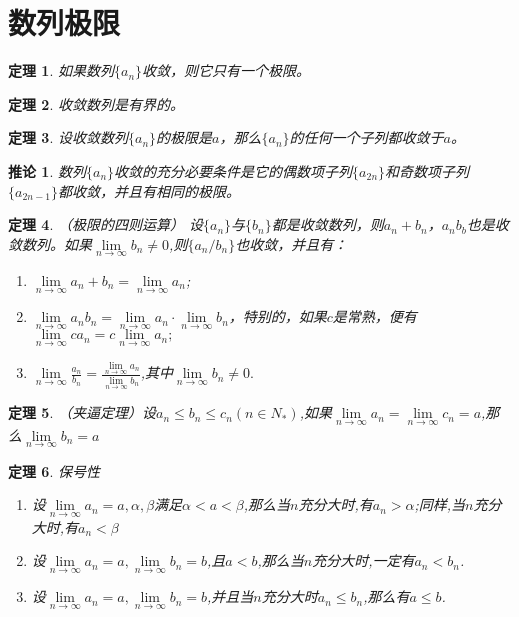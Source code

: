 \documentclass[UTF8]{ctexart}
\newtheorem{theorem}{定理}[section]
\newtheorem{coro}{推论}[theorem]
\begin{document}
	\section{数列极限}
	\begin{theorem}
		如果数列$\{a_n\}$收敛，则它只有一个极限。
	\end{theorem}
	\begin{theorem}
	收敛数列是有界的。
	\end{theorem}
	\begin{theorem}
	设收敛数列$\{a_n\}$的极限是$a$，那么$\{a_n\}$的任何一个子列都收敛于$a$。
	\end{theorem}
	\begin{coro}
		数列$\{a_n\}$收敛的充分必要条件是它的偶数项子列$\{a_{2n}\}$和奇数项子列$\{a_{2n-1}\}$都收敛，并且有相同的极限。
	\end{coro}
	\begin{theorem}（极限的四则运算）
	设$\{a_n\}$与$\{b_n\}$都是收敛数列，则${a_n+b_n}$，${a_nb_b}$也是收敛数列。如果$\lim\limits_{n\to\infty}b_n\neq0$,则$\{a_n/b_n\}$也收敛，并且有：
	\begin{enumerate}
		\item $\lim\limits_{n\to\infty}a_n+b_n=\lim\limits_{n\to\infty}a_n$;
		\item $\lim\limits_{n\to\infty}a_nb_n=\lim\limits_{n\to\infty}a_n \cdot \lim\limits_{n\to\infty}b_n$，特别的，如果$c$是常熟，便有$\lim\limits_{n\to\infty}ca_n=c\lim\limits_{n\to\infty}a_n;$
		\item $\lim\limits_{n\to\infty} \frac{a_n}{b_n}=\frac{\lim\limits_{n\to\infty}a_n}{\lim\limits_{n\to\infty}b_n}$,其中$\lim\limits_{n\to\infty}b_n\neq0.$	
	\end{enumerate}
	\end{theorem}
	\begin{theorem}
	（夹逼定理）设$a_n\leq b_n \leq c_n (n\in N_*)$,如果$\lim\limits_{n\to\infty}a_n=\lim\limits_{n\to\infty}c_n=a$,那么$\lim\limits_{n\to\infty}b_n=a$
	\end{theorem}
	\begin{theorem}保号性
	\begin{enumerate}
		\item 设$\lim\limits_{n\to\infty}a_n=a,\alpha,\beta$满足$\alpha<a<\beta$,那么当$n$充分大时,有$a_n>\alpha$;同样,当$n$充分大时,有$a_n<\beta$
		\item 设$\lim\limits_{n\to\infty}a_n=a,\lim\limits_{n\to\infty}b_n=b$,且$a<b$,那么当$n$充分大时,一定有$a_n<b_n$.
		\item 设$\lim\limits_{n\to\infty}a_n=a,\lim\limits_{n\to\infty}b_n=b$,并且当$n$充分大时$a_n\leq b_n$,那么有$a \leq b$.
	\end{enumerate}
	\end{theorem}
\end{document}
